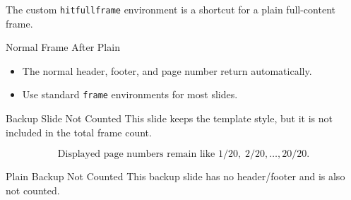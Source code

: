 \documentclass[aspectratio=169]{beamer}
\begin{document}
\begin{hitfullframe}
\centering
The custom \texttt{hitfullframe} environment is a shortcut for a plain full-content frame.
\end{hitfullframe}

\begin{frame}{Normal Frame After Plain}
\begin{itemize}
  \item The normal header, footer, and page number return automatically.
  \item Use standard \texttt{frame} environments for most slides.
\end{itemize}
\end{frame}

\appendix

\begin{frame}[noframenumbering]{Backup Slide Not Counted}
This slide keeps the template style, but it is not included in the total frame count.

\[
  \text{Displayed page numbers remain like } 1/20,\;2/20,\ldots,20/20.
\]
\end{frame}

\begin{frame}{Plain Backup Not Counted}
\centering
This backup slide has no header/footer and is also not counted.
\end{frame}
\end{document}
